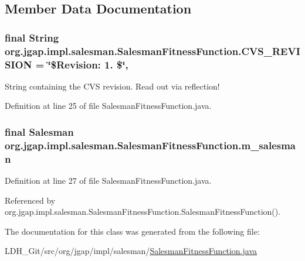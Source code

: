 \subsection{Member Data Documentation}
\hypertarget{classorg_1_1jgap_1_1impl_1_1salesman_1_1_salesman_fitness_function_a438943191a81a36319e2893b701cbc46}{
\subsubsection[{C\-V\-S\-\_\-\-R\-E\-V\-I\-S\-I\-O\-N}]{\setlength{\rightskip}{0pt plus 5cm}final String org.\-jgap.\-impl.\-salesman.\-Salesman\-Fitness\-Function.\-C\-V\-S\-\_\-\-R\-E\-V\-I\-S\-I\-O\-N = \char`\"{}\$Revision\-: 1. \$\char`\"{}\hspace{0.3cm}{\ttfamily [static]}, {\ttfamily [private]}}}\label{classorg_1_1jgap_1_1impl_1_1salesman_1_1_salesman_fitness_function_a438943191a81a36319e2893b701cbc46}
String containing the C\-V\-S revision. Read out via reflection! 

Definition at line 25 of file Salesman\-Fitness\-Function.\-java.

\hypertarget{classorg_1_1jgap_1_1impl_1_1salesman_1_1_salesman_fitness_function_a3088a30ee6def3ac8460565b98af2f5b}{
\subsubsection[{m\-\_\-salesman}]{\setlength{\rightskip}{0pt plus 5cm}final {\bf Salesman} org.\-jgap.\-impl.\-salesman.\-Salesman\-Fitness\-Function.\-m\-\_\-salesman\hspace{0.3cm}{\ttfamily [private]}}}\label{classorg_1_1jgap_1_1impl_1_1salesman_1_1_salesman_fitness_function_a3088a30ee6def3ac8460565b98af2f5b}


Definition at line 27 of file Salesman\-Fitness\-Function.\-java.



Referenced by org.\-jgap.\-impl.\-salesman.\-Salesman\-Fitness\-Function.\-Salesman\-Fitness\-Function().



The documentation for this class was generated from the following file\-:\begin{DoxyCompactItemize}
\item 
L\-D\-H\-\_\-\-Git/src/org/jgap/impl/salesman/\hyperlink{_salesman_fitness_function_8java}{Salesman\-Fitness\-Function.\-java}\end{DoxyCompactItemize}
